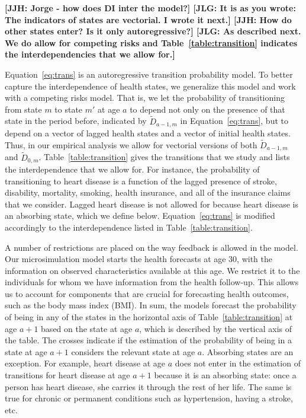 \textbf{[JJH: Jorge - how does DI inter the model?] [JLG: It is as you wrote: The indicators of states are vectorial. I wrote it next.] [JJH: How do other states enter? Is it only autoregressive?] [JLG: As described next. We do allow for competing risks and Table~\ref{table:transition} indicates the interdependencies that we allow for.]}

\noindent Equation~\eqref{eq:trans} is an autoregressive transition probability model. To better capture the interdependence of health states, we generalize this model and work with a competing risks model. That is, we let the probability of transitioning from state $m$ to state $m'$ at age $a$ to depend not only on the presence of that state in the period before, indicated by  $\tilde{D}_{a-1,m}$ in Equation~\eqref{eq:trans}, but to depend on a vector of lagged health states and a vector of initial health states. Thus, in our empirical analysis we allow for vectorial versions of both $ \tilde{D}_{a-1,m}$ and  $\tilde{D}_{0,m}$. Table~\ref{table:transition} gives the transitions that we study and lists the interdependence that we allow for. For instance, the probability of transitioning to heart disease is a function of the lagged presence of stroke, disability, mortality, smoking, health insurance, and all of the insurance claims that we consider. Lagged heart disease is not allowed for because heart disease is an absorbing state, which we define below. Equation~\eqref{eq:trans} is modified accordingly to the interdependence listed in Table~\ref{table:transition}.

\noindent A number of restrictions are placed on the way feedback is allowed in the model. Our microsimulation model starts the health forecasts at age 30, with the information on observed characteristics available at this age. We restrict it to the individuals for whom we have information from the health follow-up. This allows us to account for components that are crucial for forecasting health outcomes, such as the body mass index (BMI). In sum, the models forecast the probability of being in any of the states in the horizontal axis of Table~\ref{table:transition} at age $a+1$ based on the state at age $a$, which is described by the vertical axis of the table. The crosses indicate if the estimation of the probability of being in a state at age $a+1$ considers the relevant state at age $a$. Absorbing states are an exception. For example, heart disease at age $a$ does not enter in the estimation of transitions for heart disease at age $a+1$ because it is an absorbing state: once a person has heart disease, she carries it through the rest of her life. The same is true for chronic or permanent conditions such as hypertension, having a stroke, etc.


